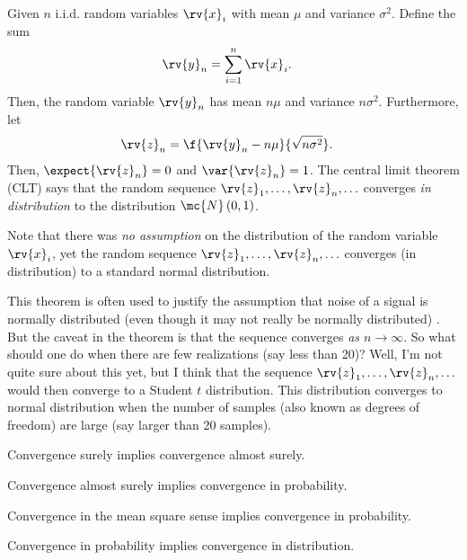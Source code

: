 \begin{theoremBox}
   Given $n$ i.i.d. random variables $\rv{x}_{i}$ with mean $\mu$ and variance $\sigma^{2}$. Define the sum
   \begin{align}
       \rv{y}_{n} &= \sum_{i=1}^{n}\rv{x}_{i}.
   \end{align}
   Then, the random variable $\rv{y}_{n}$ has mean $n\mu$ and variance $n\sigma^{2}$. Furthermore, let
   \begin{align}
       \rv{z}_{n} &= \f{\rv{y}_{n} - n\mu}{\sqrt{n\sigma^{2}}}.
   \end{align}
   Then, $\expect{\rv{z}_{n}} = 0$ and $\var{\rv{z}_{n}} = 1$. The central limit theorem (CLT) says that the random sequence $\rv{z}_{1},\ldots, \rv{z}_{n}, \ldots$ converges \emph{in distribution} to the distribution $\mc{N}\left( 0,1 \right)$. 
\end{theoremBox}
\begin{remarkBox}
    Note that there was \emph{no assumption} on the distribution of the random variable $\rv{x}_{i}$, yet the random sequence $\rv{z}_{1},\ldots, \rv{z}_{n},\ldots$ converges (in distribution) to a standard normal distribution.

    This theorem is often used to justify the assumption that noise of a signal is normally distributed (even though it may not really be normally distributed) \cite{li_evaluation_2012}. But the caveat in the theorem is that the sequence converges \emph{as $n\to\infty$}. So what should one do when there are few realizations (say less than 20)? Well, I'm not quite sure about this yet, but I think that the sequence $\rv{z}_{1}, \ldots, \rv{z}_{n}, \ldots$ would then converge to a Student $t$ distribution. This distribution converges to normal distribution when the number of samples (also known as degrees of freedom) are large (say larger than 20 samples).
\end{remarkBox}


\begin{theoremBox}
     Convergence surely implies convergence almost surely.
\end{theoremBox}

\begin{theoremBox}
     Convergence almost surely implies convergence in probability.
\end{theoremBox}

\begin{theoremBox}
     Convergence in the mean square sense implies convergence in probability.
\end{theoremBox}
\begin{theoremBox}
     Convergence in probability implies convergence in distribution.
\end{theoremBox}